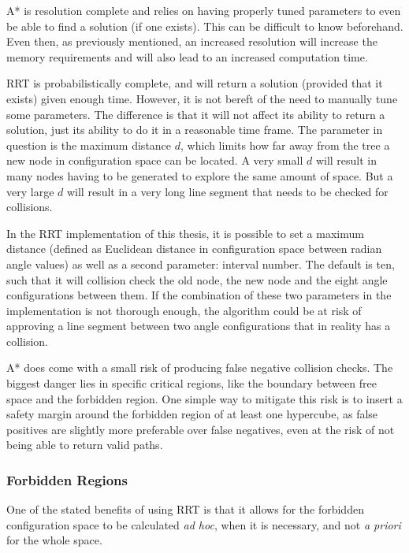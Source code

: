 A* is resolution complete and relies on having properly tuned parameters to even be able to find a solution (if one exists). This can be difficult to know beforehand. Even then, as previously mentioned, an increased resolution will increase the memory requirements and will also lead to an increased computation time.

\gls{RRT} is probabilistically complete, and will return a solution (provided that it exists) given enough time. However, it is not bereft of the need to manually tune some parameters. The difference is that it will not affect its ability to return a solution, just its ability to do it in a reasonable time frame. The parameter in question is the maximum distance $d$, which limits how far away from the tree a new node in configuration space can be located. A very small $d$ will result in many nodes having to be generated to explore the same amount of space. But a very large $d$ will result in a very long line segment that needs to be checked for collisions. 

In the \gls{RRT} implementation of this thesis, it is possible to set a maximum distance (defined as Euclidean distance in configuration space between radian angle values) as well as a second parameter: interval number. The default is ten, such that it will collision check the old node, the new node and the eight angle configurations between them. If the combination of these two parameters in the implementation is not thorough enough, the algorithm could be at risk of approving a line segment between two angle configurations that in reality has a collision. 

A* does come with a small risk of producing false negative collision checks. The biggest danger lies in specific critical regions, like the boundary between free space and the forbidden region. One simple way to mitigate this risk is to insert a safety margin around the forbidden region of at least one hypercube, as false positives are slightly more preferable over false negatives, even at the risk of not being able to return valid paths.

\subsubsection{Forbidden Regions}

One of the stated benefits of using \gls{RRT} is that it allows for the forbidden configuration space to be calculated \textit{ad hoc}, when it is necessary, and not \textit{a priori} for the whole space.


